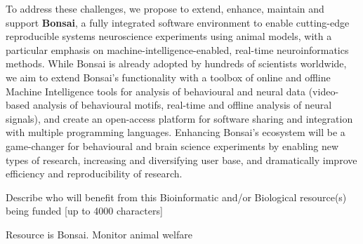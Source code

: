 To address these challenges, we propose to extend, enhance, maintain and support \textbf{Bonsai}, a fully integrated software environment to enable cutting-edge reproducible systems neuroscience experiments using animal models, with a particular emphasis on machine-intelligence-enabled, real-time neuroinformatics methods. While Bonsai is already adopted by hundreds of scientists worldwide, we aim to extend Bonsai’s functionality with a toolbox of online and offline Machine Intelligence tools for analysis of behavioural and neural data (video-based analysis of behavioural motifs, real-time and offline analysis of neural signals), and create an open-access platform for software sharing and integration with multiple programming languages. Enhancing Bonsai's ecosystem will be a game-changer for behavioural and brain science experiments by enabling new types of research, increasing and diversifying user base, and dramatically improve efficiency and reproducibility of research.


Describe who will benefit from this Bioinformatic and/or Biological resource(s) being funded [up to 4000 characters]

Resource is Bonsai.
Monitor animal welfare


